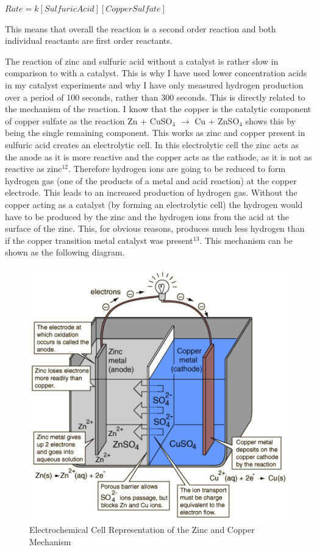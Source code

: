 $Rate = k [Sulfuric Acid] [Copper Sulfate]$

This means that overall the reaction is a second order reaction and both individual reactants are first order reactants.






The reaction of zinc and sulfuric acid without a catalyst is rather slow in comparison to with a catalyst. This is why I have used lower concentration acids in my catalyst experiments and why I have only measured hydrogen production over a period of 100 seconds, rather than 300 seconds. This is directly related to the mechanism of the reaction. I know that the copper is the catalytic component of copper sulfate as the reaction Zn + CuSO$_4$ $\rightarrow$ Cu + ZnSO$_4$ shows this by being the single remaining component. This works as zinc and copper present in sulfuric acid creates an electrolytic cell. In this electrolytic cell the zinc acts as the anode as it is more reactive and the copper acts as the cathode, as it is not as reactive as zinc$^{12}$. Therefore hydrogen ions are going to be reduced to form hydrogen gas (one of the products of a metal and acid reaction) at the copper electrode. This leads to an increased production of hydrogen gas. Without the copper acting as a catalyst (by forming an electrolytic cell) the hydrogen would have to be produced by the zinc and the hydrogen ions from the acid at the surface of the zinc. This, for obvious reasons, produces much less hydrogen than if the copper transition metal catalyst was present$^{13}$. This mechanism can be shown as the following diagram.

\begin{figure}[H]
    \includegraphics[width=\textwidth]{./Analysis/Images/ElectrochemicalCell.png}
    \caption{Electrochemical Cell Representation of the Zinc and Copper Mechanism} \label{fig:ZincCopperCell}
\end{figure}

